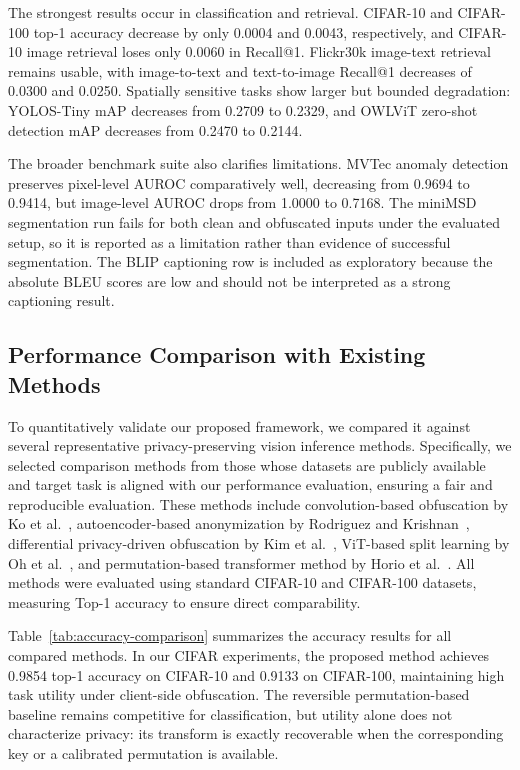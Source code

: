 \documentclass{ieeeaccess}
\newcommand{\rev}[1]{{\color{black}#1}}
\begin{document}
\rev{The strongest results occur in classification and retrieval. CIFAR-10 and CIFAR-100 top-1 accuracy decrease by only 0.0004 and 0.0043, respectively, and CIFAR-10 image retrieval loses only 0.0060 in Recall@1. Flickr30k image-text retrieval remains usable, with image-to-text and text-to-image Recall@1 decreases of 0.0300 and 0.0250. Spatially sensitive tasks show larger but bounded degradation: YOLOS-Tiny mAP decreases from 0.2709 to 0.2329, and OWLViT zero-shot detection mAP decreases from 0.2470 to 0.2144.}

\rev{The broader benchmark suite also clarifies limitations. MVTec anomaly detection preserves pixel-level AUROC comparatively well, decreasing from 0.9694 to 0.9414, but image-level AUROC drops from 1.0000 to 0.7168. The miniMSD segmentation run fails for both clean and obfuscated inputs under the evaluated setup, so it is reported as a limitation rather than evidence of successful segmentation. The BLIP captioning row is included as exploratory because the absolute BLEU scores are low and should not be interpreted as a strong captioning result.}





\subsection{Performance Comparison with Existing Methods}\label{sec:comparison}

To quantitatively validate our proposed framework, we compared it against several representative privacy-preserving vision inference methods. Specifically, we selected comparison methods from those whose datasets are publicly available and target task is aligned with our performance evaluation, ensuring a fair and reproducible evaluation. These methods include convolution-based obfuscation by Ko et al.~\cite{9129656}, autoencoder-based anonymization by Rodriguez and Krishnan~\cite{10.1007/978-3-031-37586-6_18}, differential privacy-driven obfuscation by Kim et al.~\cite{s24103166}, ViT-based split learning by Oh et al.~\cite{oh2022differentially}, and permutation-based transformer method by Horio et al.~\cite{horio2024privacypreservingvisiontransformerusing}. All methods were evaluated using standard CIFAR-10 and CIFAR-100 datasets, measuring Top-1 accuracy to ensure direct comparability.

\rev{Table~\ref{tab:accuracy-comparison} summarizes the accuracy results for all compared methods. In our CIFAR experiments, the proposed method achieves 0.9854 top-1 accuracy on CIFAR-10 and 0.9133 on CIFAR-100, maintaining high task utility under client-side obfuscation. The reversible permutation-based baseline remains competitive for classification, but utility alone does not characterize privacy: its transform is exactly recoverable when the corresponding key or a calibrated permutation is available.}
\end{document}
